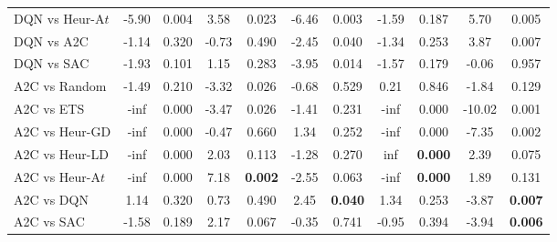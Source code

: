 \begin{tabular}{lcccccccccc}
	DQN vs Heur-A$t$  & -5.90         & 0.004                  & 3.58          & 0.023                  & -6.46          & 0.003                 & -1.59          & 0.187                 & 5.70           & 0.005                 \\
	DQN vs A2C       & -1.14         & 0.320                  & -0.73         & 0.490                  & -2.45          & 0.040                 & -1.34          & 0.253                 & 3.87           & 0.007                 \\
	DQN vs SAC       & -1.93         & 0.101                  & 1.15          & 0.283                  & -3.95          & 0.014                 & -1.57          & 0.179                 & -0.06          & 0.957                 \\
	\midrule 
	A2C vs Random    & -1.49         & 0.210                  & -3.32         & 0.026                  & -0.68          & 0.529                 & 0.21           & 0.846                 & -1.84          & 0.129                 \\
	A2C vs ETS       & -inf          & 0.000                  & -3.47         & 0.026                  & -1.41          & 0.231                 & -inf           & 0.000                 & -10.02         & 0.001                 \\
	A2C vs Heur-GD   & -inf          & 0.000                  & -0.47         & 0.660                  & 1.34           & 0.252                 & -inf           & 0.000                 & -7.35          & 0.002                 \\
	A2C vs Heur-LD   & -inf          & 0.000                  & 2.03          & 0.113                  & -1.28          & 0.270                 & inf            & \textbf{0.000}        & 2.39           & 0.075                 \\
	A2C vs Heur-A$t$  & -inf          & 0.000                  & 7.18          & \textbf{0.002}         & -2.55          & 0.063                 & -inf           & \textbf{0.000}        & 1.89           & 0.131                 \\
	A2C vs DQN       & 1.14          & 0.320                  & 0.73          & 0.490                  & 2.45           & \textbf{0.040}        & 1.34           & 0.253                 & -3.87          & \textbf{0.007}        \\
	A2C vs SAC       & -1.58         & 0.189                  & 2.17          & 0.067                  & -0.35          & 0.741                 & -0.95          & 0.394                 & -3.94          & \textbf{0.006}        \\

\end{tabular}
